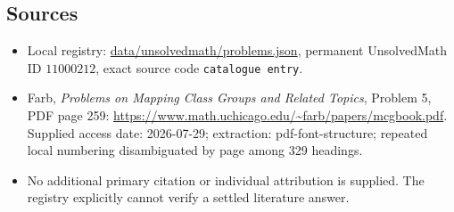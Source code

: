 \documentclass[11pt]{article}
\begin{document}
\subsection{Sources}
\begin{itemize}
\item Local registry: \url{data/unsolvedmath/problems.json}, permanent UnsolvedMath ID $11000212$, exact source code \texttt{catalogue entry}.
\item Farb, \emph{Problems on Mapping Class Groups and Related Topics}, Problem 5, PDF page 259: \url{https://www.math.uchicago.edu/~farb/papers/mcgbook.pdf}. Supplied access date: 2026-07-29; extraction: pdf-font-structure; repeated local numbering disambiguated by page among 329 headings.
\item No additional primary citation or individual attribution is supplied. The registry explicitly cannot verify a settled literature answer.
\end{itemize}
\end{document}
